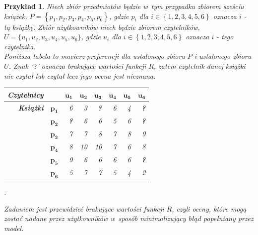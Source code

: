 \documentclass[12pt,a4paper]{report}
\newtheorem{przyklad}{Przykład}[chapter]{\normalfont}
\newcommand{\set}[1]{\left\lbrace {#1} \right\rbrace}
\newcommand{\setUzytkownicy}{\mathit{U}}
\newcommand{\setPrzedmioty}{\mathit{P}}
\begin{document}
\begin{przyklad}
Niech zbiór przedmiotów będzie w~tym przypadku zbiorem sześciu książek, $\setPrzedmioty = \set{p_1, p_2, p_3, p_4, p_5, p_6}$, gdzie $p_i$ dla $i \in \set{1,2,3,4,5,6}$ oznacza $i$ - tą książkę. Zbiór użytkowników niech będzie zbiorem czytelników, $\setUzytkownicy = \{u_1, u_2, u_3, u_4, u_5, u_6\}$, gdzie $u_i$ dla $i \in \set{1,2,3,4,5,6}$ oznacza $i$ - tego czytelnika.
\\Poniższa tabela to macierz preferencji dla ustalonego zbioru $\setPrzedmioty$ i ustalonego zbioru $\setUzytkownicy$. Znak '?' oznacza brakujące wartości funkcji $R$, zatem czytelnik danej książki nie czytał lub czytał lecz jego ocena jest nieznana.
\begin{center}
\begin{tabular}{|r|r|r|r|r|r|r|r|} \hline
\textbf{Czytelnicy} & & $\mathbf{u_1}$ & $\mathbf{u_2}$ & $\mathbf{u_3}$ & $\mathbf{u_4}$ & $\mathbf{u_5}$ & $\mathbf{u_6}$ \\
\hline
\hline
\textbf{Książki} &$\mathbf{p_1}$ & 6 & 3 & \textbf{?} & 6 & 4 & \textbf{?} \\
\hline
&$\mathbf{p_2}$ & \textbf{?} & 6 & 6 & 5 & 6 & \textbf{?} \\
\hline
&$\mathbf{p_3}$ & 7 & 7 & 8 & 7 & 8 & 9  \\
\hline
&$\mathbf{p_4}$ & 8 & 10 & 10 & 7 & 6 & 8 \\
\hline
&$\mathbf{p_5}$ & 9 & 6 & 6 & 6 & 6 & \textbf{?} \\
\hline
&$\mathbf{p_6}$ & 5 & 7 & 7 & 5 & 4 & 2 \\
\hline
\end{tabular}.
\end{center}

Zadaniem jest przewidzieć brakujące wartości funkcji $R$, czyli oceny, które mogą zostać nadane przez użytkowników w~sposób minimalizujący błąd popełniany przez model.
\end{przyklad}
\end{document}
